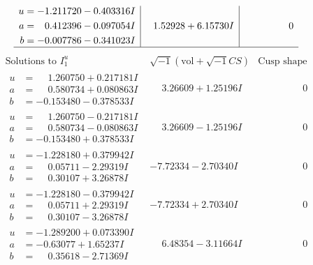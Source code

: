 \documentclass[1p]{elsarticle_modified}
\theoremstyle{definition}
\newcommand{\I}{\sqrt{-1}}
\begin{document}
$$\begin{array}{c|c|c}
\begin{aligned}
u &= -1.211720 - 0.403316 I \\
a &= \phantom{-}0.412396 - 0.097054 I \\
b &= -0.007786 - 0.341023 I\end{aligned}
 & \phantom{-}1.52928 + 6.15730 I & \phantom{-0.000000 } 0\\
 \hline 
 \end{array}$$\newpage$$\begin{array}{c|c|c}  
\text{Solutions to }I^u_{1}& \I (\text{vol} + \sqrt{-1}CS) & \text{Cusp shape}\\
 \hline 
\begin{aligned}
u &= \phantom{-}1.260750 + 0.217181 I \\
a &= \phantom{-}0.580734 + 0.080863 I \\
b &= -0.153480 - 0.378533 I\end{aligned}
 & \phantom{-}3.26609 + 1.25196 I & \phantom{-0.000000 } 0 \\ \hline\begin{aligned}
u &= \phantom{-}1.260750 - 0.217181 I \\
a &= \phantom{-}0.580734 - 0.080863 I \\
b &= -0.153480 + 0.378533 I\end{aligned}
 & \phantom{-}3.26609 - 1.25196 I & \phantom{-0.000000 } 0 \\ \hline\begin{aligned}
u &= -1.228180 + 0.379942 I \\
a &= \phantom{-}0.05711 - 2.29319 I \\
b &= \phantom{-}0.30107 + 3.26878 I\end{aligned}
 & -7.72334 - 2.70340 I & \phantom{-0.000000 } 0 \\ \hline\begin{aligned}
u &= -1.228180 - 0.379942 I \\
a &= \phantom{-}0.05711 + 2.29319 I \\
b &= \phantom{-}0.30107 - 3.26878 I\end{aligned}
 & -7.72334 + 2.70340 I & \phantom{-0.000000 } 0 \\ \hline\begin{aligned}
u &= -1.289200 + 0.073390 I \\
a &= -0.63077 + 1.65237 I \\
b &= \phantom{-}0.35618 - 2.71369 I\end{aligned}
 & \phantom{-}6.48354 - 3.11664 I & \phantom{-0.000000 } 0 \\ \hline\begin{aligned}

\end{aligned}
\end{array}$$
\end{document}
